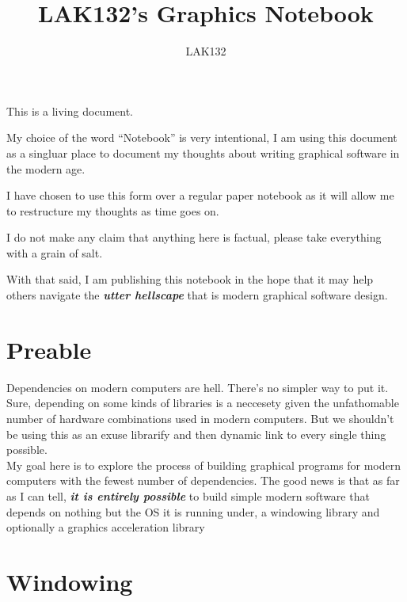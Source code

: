 \documentclass{article}
\title{LAK132's Graphics Notebook}
\author{LAK132}
\begin{document}
\maketitle

This is a living document.

My choice of the word ``Notebook'' is very intentional,
I am using this document as a singluar place to document my thoughts about
writing graphical software in the modern age.

I have chosen to use this form over a regular paper notebook as it will allow
me to restructure my thoughts as time goes on.

I do not make any claim that anything here is factual,
please take everything with a grain of salt.

With that said, I am publishing this notebook in the hope that it may help
others navigate the \textit{\textbf{utter hellscape}} that is modern graphical
software design.

\tableofcontents


\section{Preable}
\label{sec:preamble}

Dependencies on modern computers are hell.
There's no simpler way to put it.
Sure, depending on some kinds of libraries is a neccesety given the
unfathomable number of hardware combinations used in modern computers.
But we shouldn't be using this as an exuse librarify and then dynamic link to
every single thing possible.
\\
My goal here is to explore the process of building graphical programs for
modern computers with the fewest number of dependencies.
The good news is that as far as I can tell,
\textit{\textbf{it is entirely possible}} to build simple modern software that
depends on nothing but the OS it is running under, a windowing library and
optionally a graphics acceleration library


\section{Windowing}
\label{sec:windowing}
\end{document}
